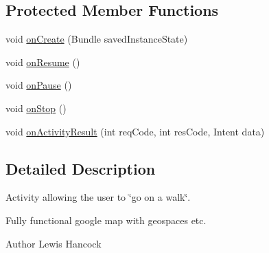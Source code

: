 \subsection*{Protected Member Functions}
\begin{DoxyCompactItemize}
\item 
void \hyperlink{classuk_1_1ac_1_1swan_1_1digitaltrails_1_1activities_1_1_map_activity_a9604f4b84594a1fee2389772b3070914}{on\+Create} (Bundle saved\+Instance\+State)
\item 
void \hyperlink{classuk_1_1ac_1_1swan_1_1digitaltrails_1_1activities_1_1_map_activity_a190bbbb4b068268fba6ae30cc34024dc}{on\+Resume} ()
\item 
void \hyperlink{classuk_1_1ac_1_1swan_1_1digitaltrails_1_1activities_1_1_map_activity_a823e94707eb400a79fcf867c6f2a1379}{on\+Pause} ()
\item 
void \hyperlink{classuk_1_1ac_1_1swan_1_1digitaltrails_1_1activities_1_1_map_activity_a9d4475e7cf73f417482bc6ba30dee6f6}{on\+Stop} ()
\item 
void \hyperlink{classuk_1_1ac_1_1swan_1_1digitaltrails_1_1activities_1_1_map_activity_ade3334b7c3e082a4375b0751b0e2a953}{on\+Activity\+Result} (int req\+Code, int res\+Code, Intent data)
\end{DoxyCompactItemize}


\subsection{Detailed Description}
Activity allowing the user to \char`\"{}go on a walk\char`\"{}. 

Fully functional google map with geospaces etc. \begin{DoxyAuthor}{Author}
Lewis Hancock 
\end{DoxyAuthor}


